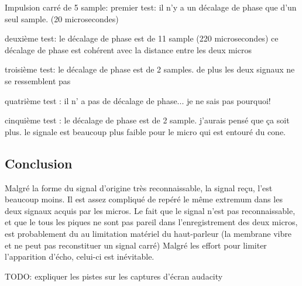 \documentclass[12pt,a4paper]{article}
\begin{document}
	Impulsion carré de 5 sample:
		premier test:
			il n'y a un décalage de phase que d'un seul sample. (20 microsecondes)

		deuxième test:
			le décalage de phase est de 11 sample (220 microsecondes)
			ce décalage de phase est cohérent avec la distance entre les deux micros

		troisième test:
			le décalage de phase est de 2 samples.
			de plus les deux signaux ne se ressemblent pas 

		quatrième test :
			il n' a pas de décalage de phase... je ne sais pas pourquoi!

		cinquième test :
	        le décalage de phase est de 2 sample. j'aurais pensé que ça soit plus.
	        le signale est beaucoup plus faible pour le micro qui est entouré du cone. 


\subsection{Conclusion}
	Malgré la forme du signal d'origine très reconnaissable, la signal reçu, l'est beaucoup moins. Il est assez compliqué de repéré le même extremum dans les deux signaux acquis par les micros.
	Le fait que le signal n'est pas reconnaissable, et que le tous les piques ne sont pas pareil dans l'enregistrement des deux micros, est probablement du au limitation matériel du haut-parleur (la membrane vibre et ne peut pas reconstituer un signal carré)
	Malgré les effort pour limiter l'apparition d'écho, celui-ci est inévitable.



TODO: expliquer les pistes sur les captures d'écran audacity
\end{document}
